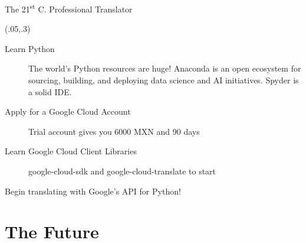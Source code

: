\documentclass{beamer}
\begin{document}
\begin{frame}{The 21\textsuperscript{st}  C. Professional Translator}


\begin{textblock}{1}(.05,.3)
\begin{description}
  \item [Learn Python] The world's Python resources are huge! Anaconda is an open ecosystem for
sourcing, building, and deploying data science and AI initiatives. Spyder is a solid IDE.
  \item [Apply for a Google Cloud Account] Trial account gives you 6000 MXN and 90 days
  \item [Learn Google Cloud Client Libraries] google-cloud-sdk and google-cloud-translate to start
  \item [Begin translating with Google's API for Python!]
\end{description}

\end{textblock}

\end{frame}

\section{The Future}
\end{document}
